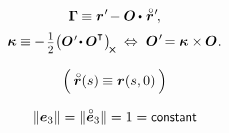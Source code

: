     

\nopagebreak\vspace{-0.2em}\begin{gather}
\firstdeformationvectorcosseratline \hspace{-0.1ex} \equiv \currentlocationvector{\hspace{.1ex}'} \hspace{-0.3ex} - \rotationtensor \hspace{-0.1ex} \dotp \hspace{.15ex} \initiallocationvector{\hspace{.1ex}'}
\hspace{-0.25ex} ,
\label{cosseratrod.firstdeformationvector}
\\[.1em]
%
\seconddeformationvectorcosseratline \hspace{-0.1ex} \equiv \hspace{-0.1ex} - \hspace{.25ex} \smalldisplaystyleonehalf \scalebox{.96}{$ \bigl( \rotationtensor{\hspace{.15ex}'} \hspace{-0.3ex} \dotp \rotationtensor^{\T} \hspace{.1ex} \bigr)_{\hspace{-0.3ex}\Xcompanion} $}
\hspace{.25em} \Leftrightarrow \hspace{.3em}
\rotationtensor{\hspace{.15ex}'} \hspace{-0.33ex} = \seconddeformationvectorcosseratline \times \hspace{-0.1ex} \rotationtensor
\hspace{.1ex} .
\label{cosseratrod.seconddeformationvector}
\end{gather}

\begin{equation*}
\Bigl( \hspace{.2em}
\initiallocationvector(s) \hspace{-0.1ex}
\equiv
\currentlocationvector(s, 0)
\hspace{.2em} \Bigr)
\vspace{-0.2em}
\end{equation*}

\begin{equation*}
\| \bm{e}_{3} \| = \| \mathcircabove{\bm{e}}_{3} \| = 1 = \constant
\end{equation*}

